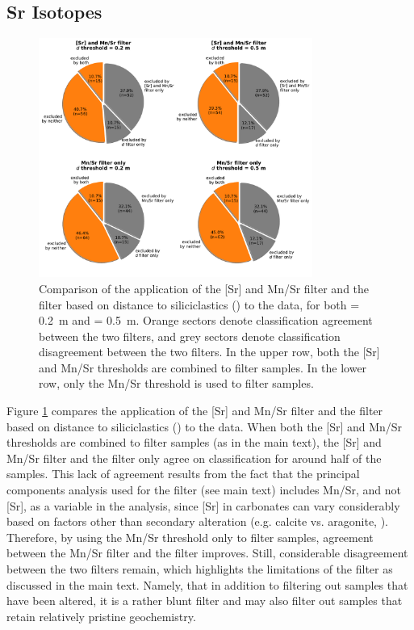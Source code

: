 \clearpage

\subsection{Sr Isotopes}

\begin{figure}[h!]
\begin{center}
	\includegraphics[width=0.8\textwidth]{figures/Tambien/filter-comparison.pdf}
	\caption[Comparison of the application of the Sr and Mn/Sr filter and the filter based on distance to siliciclastics to the \SrSr data.]{Comparison of the application of the [Sr] and Mn/Sr filter and the filter based on distance to siliciclastics (\dsil) to the \SrSr data, for both \dsil = 0.2~m and \dsil = 0.5~m. Orange sectors denote classification agreement between the two filters, and grey sectors denote classification disagreement between the two filters. In the upper row, both the [Sr] and Mn/Sr thresholds are combined to filter samples. In the lower row, only the Mn/Sr threshold is used to filter samples.}
	\label{fig:filter-comparison}
\end{center}
\end{figure}

Figure \ref{fig:filter-comparison} compares the application of the [Sr] and Mn/Sr filter and the filter based on distance to siliciclastics (\dsil) to the \SrSr data. When both the [Sr] and Mn/Sr thresholds are combined to filter samples (as in the main text), the [Sr] and Mn/Sr filter and the \dsil filter only agree on classification for around half of the samples. This lack of agreement results from the fact that the principal components analysis used for the \dsil filter (see main text) includes Mn/Sr, and not [Sr], as a variable in the analysis, since [Sr] in carbonates can vary considerably based on factors other than secondary alteration (e.g. calcite vs. aragonite, \citealp{Husson2015b}). Therefore, by using the Mn/Sr threshold only to filter samples, agreement between the Mn/Sr filter and the \dsil filter improves. Still, considerable disagreement between the two filters remain, which highlights the limitations of the \dsil filter as discussed in the main text. Namely, that in addition to filtering out samples that have been altered, it is a rather blunt filter and may also filter out samples that retain relatively pristine geochemistry.

